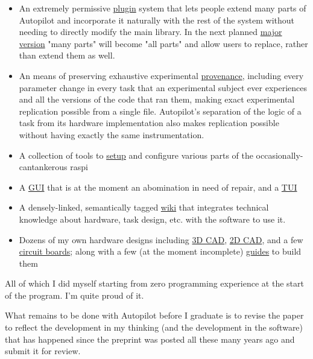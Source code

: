 \begin{done}
\begin{itemize}
\item An extremely permissive \href{https://docs.auto-pi-lot.com/en/latest/guide/plugins.html}{plugin} system that lets people extend many parts of Autopilot and incorporate it naturally with the rest of the system without needing to directly modify the main library. In the next planned \href{https://github.com/wehr-lab/autopilot/milestone/2}{major version} "many parts" will become "all parts" and allow users to replace, rather than extend them as well.
\item An means of preserving exhaustive experimental \href{https://docs.auto-pi-lot.com/en/latest/core/subject.html}{provenance}, including every parameter change in every task that an experimental subject ever experiences and all the versions of the code that ran them, making exact experimental replication possible from a single file. Autopilot's separation of the logic of a task from its hardware implementation also makes replication possible without having exactly the same instrumentation.
\item A collection of tools to \href{https://docs.auto-pi-lot.com/en/latest/setup/index.html}{setup} and configure various parts of the occasionally-cantankerous raspi
\item A \href{https://docs.auto-pi-lot.com/en/latest/core/terminal.html}{GUI} that is at the moment an abomination in need of repair, and a \href{https://docs.auto-pi-lot.com/en/latest/guide/installation.html#configuration}{TUI}
\item A densely-linked, semantically tagged \href{https://wiki.auto-pi-lot.com/index.php/Autopilot_Wiki}{wiki} that integrates technical knowledge about hardware, task design, etc. with the software to use it. 
\item Dozens of my own hardware designs including \href{https://wiki.auto-pi-lot.com/index.php/3D_CAD}{3D CAD}, \href{https://wiki.auto-pi-lot.com/index.php/2D_CAD}{2D CAD}, and a few \href{https://wiki.auto-pi-lot.com/index.php/PCBs}{circuit boards}; along with a few (at the moment incomplete) \href{https://wiki.auto-pi-lot.com/index.php/Guides}{guides} to build them
\end{itemize}

All of which I did myself starting from zero programming experience at the start of the program. I'm quite proud of it.
\end{done}

\begin{todo}
What remains to be done with Autopilot before I graduate is to revise the paper to reflect the development in my thinking (and the development in the software) that has happened since the preprint was posted all these many years ago and submit it for review. 
\end{todo}


